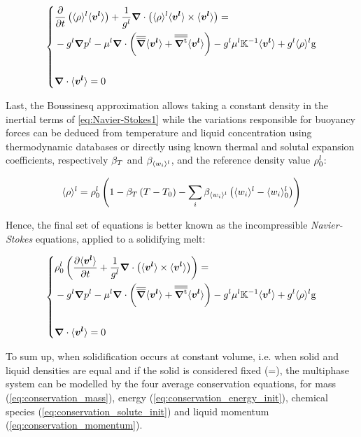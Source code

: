 \begin{equation}
\label{eq:Navier-Stokes1}
   \left\{
   \begin{aligned}
      & \temp{ \rhol \vit } + \frac{1}{\gl} \nabvec \cdot \brac{\rhol \vit \times \vit} = \\
	  &- \gl\nabvec \pl - \mul \nabvec \cdot \brac{\nabmat \vit + \nabmattransp \vit}
	  - \gl \mul \K^{-1} \vit + \gl \rhol \gravity\\ \\
      & \nabvec \cdot \vit =0
    \end{aligned}
    \right.
\end{equation}

Last, the Boussinesq approximation allows taking a constant density in the inertial terms of \cref{eq:Navier-Stokes1} 
while the variations responsible for buoyancy forces can be deduced from temperature and liquid concentration using thermodynamic
databases or directly using known thermal and solutal expansion coefficients, respectively $\beta_T$ and $\beta_{\langle w_i \rangle^l}$, and the reference density value $\rho_{0}^{l}$:

\begin{equation}
\label{eq:rholiq}
 \rhol = \rholref \brac{ 1- \betaT \brac{T-\Tref} - \sum_{i} \betawil \brac{\wil-\wilref}}
\end{equation}

Hence, the final 
set of equations is better known as the incompressible \emph{Navier-Stokes} 
equations, applied to a solidifying melt:

\begin{equation}
\label{eq:conservation_momentum}
   \left\{
   \begin{aligned}
      & \rholref \brac{\tempup{ \vit } + \frac{1}{\gl} \nabvec \cdot \brac{\vit \times \vit}} = \\
	  &- \gl\nabvec \pl - \mul \nabvec \cdot \brac{\nabmat \vit + \nabmattransp \vit}
	  - \gl \mul \K^{-1} \vit + \gl \rhol \gravity\\ \\
      & \nabvec \cdot \vit =0
    \end{aligned}
    \right.
\end{equation}


To sum up, when solidification occurs at constant volume, i.e. when solid and liquid densities are equal and if the solid is considered fixed (\vs =),
the multiphase system can be modelled by the four average conservation equations, for mass (\cref{eq:conservation_mass}), energy (\cref{eq:conservation_energy_init}), 
chemical species (\cref{eq:conservation_solute_init}) and liquid momentum (\cref{eq:conservation_momentum}).

